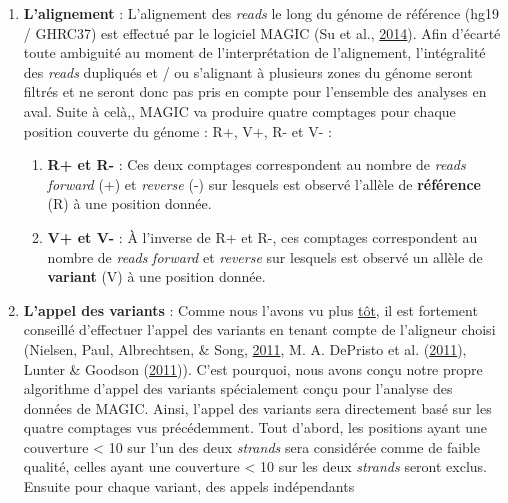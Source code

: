 \documentclass[12pt,twoside]{reedthesis}
\providecommand{\tightlist}{%
  \setlength{\itemsep}{0pt}\setlength{\parskip}{0pt}}
\theoremstyle{definition}
\theoremstyle{definition}
\theoremstyle{remark}
\begin{document}
  \begin{enumerate}
  \def\labelenumi{\arabic{enumi}.}
  \tightlist
  \item
    \textbf{L'alignement} : L'alignement des \emph{reads} le long du
    génome de référence (hg19 / GHRC37) est effectué par le logiciel MAGIC
    (Su et al., \protect\hyperlink{ref-Su2014}{2014}). Afin d'écarté toute
    ambiguité au moment de l'interprétation de l'alignement, l'intégralité
    des \emph{reads} dupliqués et / ou s'alignant à plusieurs zones du
    génome seront filtrés et ne seront donc pas pris en compte pour
    l'ensemble des analyses en aval. Suite à celà,, MAGIC va produire
    quatre comptages pour chaque position couverte du génome : R+, V+, R-
    et V- :
  
    \begin{enumerate}
    \def\labelenumii{\alph{enumii}.}
    \tightlist
    \item
      \textbf{R+ et R-} : Ces deux comptages correspondent au nombre de
      \emph{reads} \emph{forward} (+) et \emph{reverse} (-) sur lesquels
      est observé l'allèle de \textbf{référence} (R) à une position
      donnée.\\
    \item
      \textbf{V+ et V-} : À l'inverse de R+ et R-, ces comptages
      correspondent au nombre de \emph{reads} \emph{forward} et
      \emph{reverse} sur lesquels est observé un allèle de
      \textbf{variant} (V) à une position donnée.\\
    \end{enumerate}
  \item
    \textbf{L'appel des variants} : Comme nous l'avons vu plus
    \protect\hyperlink{varcall}{tôt}, il est fortement conseillé
    d'effectuer l'appel des variants en tenant compte de l'aligneur choisi
    (Nielsen, Paul, Albrechtsen, \& Song,
    \protect\hyperlink{ref-Nielsen2011}{2011}, M. A. DePristo et al.
    (\protect\hyperlink{ref-DePristo2011}{2011}), Lunter \& Goodson
    (\protect\hyperlink{ref-Lunter2011}{2011})). C'est pourquoi, nous
    avons conçu notre propre algorithme d'appel des variants spécialement
    conçu pour l'analyse des données de MAGIC. Ainsi, l'appel des variants
    sera directement basé sur les quatre comptages vus précédemment. Tout
    d'abord, les positions ayant une couverture \textless{} 10 sur l'un
    des deux \emph{strands} sera considérée comme de faible qualité,
    celles ayant une couverture \textless{} 10 sur les deux \emph{strands}
    seront exclus. Ensuite pour chaque variant, des appels indépendants

\end{enumerate}
\end{document}
